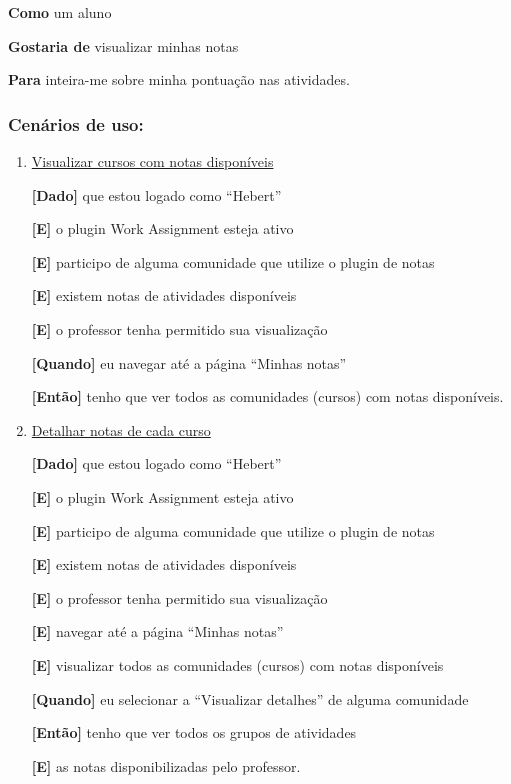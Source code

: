 \begin{enumerate}
\textbf{Como} um aluno

\textbf{Gostaria de} visualizar minhas notas

\textbf{Para} inteira-me sobre minha pontuação nas atividades.

\subsubsection*{Cenários de uso:}
\begin{enumerate}

\item \underline{Visualizar cursos com notas disponíveis}

\textbf{[Dado]} que estou logado como ``Hebert''

\textbf{[E]} o plugin Work Assignment esteja ativo

\textbf{[E]} participo de alguma comunidade que utilize o plugin de notas

\textbf{[E]} existem notas de atividades disponíveis

\textbf{[E]} o professor tenha permitido sua visualização

\textbf{[Quando]} eu navegar até a página ``Minhas notas''

\textbf{[Então]} tenho que ver todos as comunidades (cursos) com notas disponíveis.

\item \underline{Detalhar notas de cada curso}

\textbf{[Dado]} que estou logado como ``Hebert''

\textbf{[E]} o plugin Work Assignment esteja ativo

\textbf{[E]} participo de alguma comunidade que utilize o plugin de notas

\textbf{[E]} existem notas de atividades disponíveis

\textbf{[E]} o professor tenha permitido sua visualização

\textbf{[E]} navegar até a página ``Minhas notas''

\textbf{[E]} visualizar todos as comunidades (cursos) com notas disponíveis

\textbf{[Quando]} eu selecionar a ``Visualizar detalhes'' de alguma comunidade

\textbf{[Então]} tenho que ver todos os grupos de atividades

\textbf{[E]} as notas disponibilizadas pelo professor.
\end{enumerate}
\end{enumerate}

